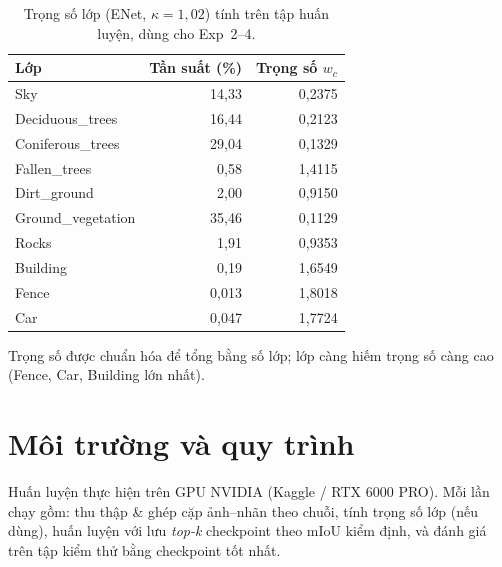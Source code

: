 \begin{table}[H]
\centering
\caption{Trọng số lớp (ENet, $\kappa=1{,}02$) tính trên tập huấn luyện, dùng cho
Exp~2--4.}
\label{tab:weights}
\small
\begin{tabular}{l r r}
\toprule
\textbf{Lớp} & \textbf{Tần suất (\%)} & \textbf{Trọng số $w_c$} \\
\midrule
Sky                & 14{,}33 & 0{,}2375 \\
Deciduous\_trees   & 16{,}44 & 0{,}2123 \\
Coniferous\_trees  & 29{,}04 & 0{,}1329 \\
Fallen\_trees      & 0{,}58  & 1{,}4115 \\
Dirt\_ground       & 2{,}00  & 0{,}9150 \\
Ground\_vegetation & 35{,}46 & 0{,}1129 \\
Rocks              & 1{,}91  & 0{,}9353 \\
Building           & 0{,}19  & 1{,}6549 \\
Fence              & 0{,}013 & 1{,}8018 \\
Car                & 0{,}047 & 1{,}7724 \\
\bottomrule
\end{tabular}
\end{table}
{\footnotesize Trọng số được chuẩn hóa để tổng bằng số lớp; lớp càng hiếm trọng số
càng cao (Fence, Car, Building lớn nhất).}

\section{Môi trường và quy trình}

Huấn luyện thực hiện trên GPU NVIDIA (Kaggle / RTX 6000 PRO). Mỗi lần chạy gồm: thu
thập \& ghép cặp ảnh--nhãn theo chuỗi, tính trọng số lớp (nếu dùng), huấn luyện với
lưu \textit{top-k} checkpoint theo mIoU kiểm định, và đánh giá trên tập kiểm thử bằng
checkpoint tốt nhất.

